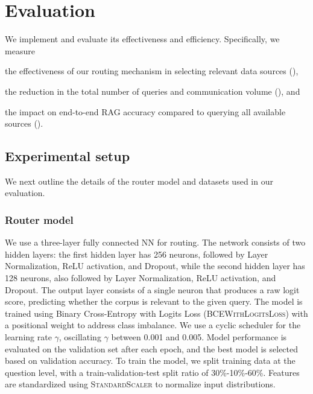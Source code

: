 \section{Evaluation}
\label{sec:evaluation}


We implement \sys and evaluate its effectiveness and efficiency. 
Specifically, we measure 
\begin{enumerate*}[label=\emph{(\roman*)}]
\item the effectiveness of our routing mechanism in selecting relevant data sources (), 
\item the reduction in the total number of queries and communication volume (), and
\item the impact on end-to-end \ac{RAG} accuracy compared to querying all available sources ().
\end{enumerate*}

\subsection{Experimental setup}
We next outline the details of the router model and datasets used in our evaluation.

\subsubsection{Router model}
We use a three-layer fully connected \ac{NN} for routing.
The network consists of two hidden layers: the first hidden layer has 256 neurons, followed by Layer Normalization, ReLU activation, and Dropout, while the second hidden layer has 128 neurons, also followed by Layer Normalization, ReLU activation, and Dropout. The output layer consists of a single neuron that produces a raw logit score, predicting whether the corpus is relevant to the given query. 
The model is trained using Binary Cross-Entropy with Logits Loss (\textsc{BCEWithLogitsLoss}) with a positional weight to address class imbalance.
We use a cyclic scheduler for the learning rate $ \gamma $, oscillating $\gamma$ between 0.001 and 0.005.
Model performance is evaluated on the validation set after each epoch, and the best model is selected based on validation accuracy.
To train the model, we split training data at the question level, with a train-validation-test split ratio of 30\%-10\%-60\%.
Features are standardized using \textsc{StandardScaler} to normalize input distributions.





